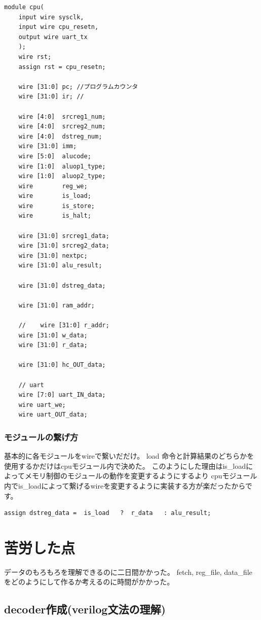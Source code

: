 \documentclass[a4paper,11pt]{jsarticle}
\begin{document}
\begin{lstlisting}[style={verilog-style}]
module cpu(
    input wire sysclk,
    input wire cpu_resetn,
    output wire uart_tx
    );
    wire rst;
    assign rst = cpu_resetn;

    wire [31:0] pc; //プログラムカウンタ
    wire [31:0] ir; //

    wire [4:0]  srcreg1_num;     
    wire [4:0]  srcreg2_num;     
    wire [4:0]  dstreg_num;    
    wire [31:0] imm;
    wire [5:0]	alucode;    
    wire [1:0]	aluop1_type; 
    wire [1:0]	aluop2_type;  
    wire	    reg_we;       
    wire	    is_load;     
    wire		is_store;    
    wire        is_halt;

    wire [31:0] srcreg1_data;
    wire [31:0] srcreg2_data;
    wire [31:0] nextpc;
    wire [31:0] alu_result;

    wire [31:0] dstreg_data;

    wire [31:0] ram_addr;

    //    wire [31:0] r_addr;
    wire [31:0] w_data;
    wire [31:0] r_data;

    wire [31:0] hc_OUT_data;

    // uart
    wire [7:0] uart_IN_data;
    wire uart_we;
    wire uart_OUT_data;\end{lstlisting}
    
    \subsubsection{モジュールの繋げ方}
    基本的に各モジュールをwireで繋いだだけ。
load 命令と計算結果のどちらかを使用するかだけはcpuモジュール内で決めた。
このようにした理由はis\_loadによってメモリ制御のモジュールの動作を変更するようにするより
cpuモジュール内でis\_loadによって繋げるwireを変更するように実装する方が楽だったからです。
\begin{lstlisting}[style={verilog-style}]
assign dstreg_data =  is_load   ?  r_data	: alu_result;
\end{lstlisting}


\section{苦労した点}
データのもろもろを理解できるのに二日間かかった。
fetch, reg\_file, data\_file をどのようにして作るか考えるのに時間がかかった。

\subsection{decoder作成(verilog文法の理解)}
\end{document}
